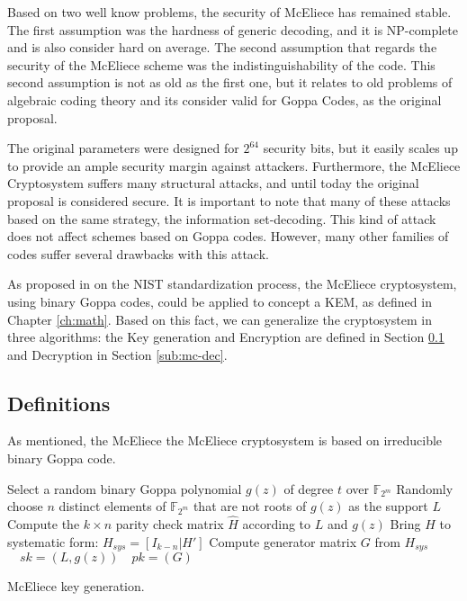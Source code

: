 Based on two well know problems, the security of McEliece has remained stable. The first assumption was the hardness of generic decoding, and it is NP-complete and is also consider hard on average. The second assumption that regards the security of the McEliece scheme was the indistinguishability of the code. This second assumption is not as old as the first one, but it relates to old problems of algebraic coding theory and its consider valid for Goppa Codes, as the original proposal. 

The original parameters were designed for $2^{64}$ security bits, but it easily scales up to provide an ample security margin against attackers. Furthermore, the McEliece Cryptosystem suffers many structural attacks, and until today the original proposal is considered secure. It is important to note that many of these attacks based on the same strategy, the information set-decoding. This kind of attack does not affect schemes based on Goppa codes. However, many other families of codes suffer several drawbacks with this attack. 


As proposed in \cite{bernstein2017classic, bardet2017big} on the NIST standardization process, the McEliece cryptosystem, using binary Goppa codes, could be applied to concept a KEM, as defined in Chapter \ref{ch:math}. Based on this fact, we can generalize the cryptosystem in three algorithms: the Key generation and Encryption are defined in Section \ref{sub:mc-def} and Decryption in Section \ref{sub:mc-dec}.

\subsection{Definitions}
\label{sub:mc-def}
As mentioned, the McEliece the McEliece cryptosystem is based on irreducible binary Goppa code. 

\begin{algorithm}[!ht]
 Select a random binary Goppa polynomial $g(z)$ of degree $t$ over $\mathbb{F}_{2^{m}}$\;
 Randomly choose $n$ distinct elements of $\mathbb{F}_{2^m}$ that are not roots of $g(z)$ as the support $L$\;
 Compute the $k \times n$ parity check matrix $\hat{H}$ according to $L$ and $g(z)$\;
 Bring $H$ to systematic form: $H_{sys} = [I_{k-n}|H']$\;
 Compute generator matrix $G$ from $H_{sys}$\;
 \Return $\quad sk = (L, g(z)) \quad pk = (G)$\;
 \caption{McEliece key generation.}
 \label{alg:1}
\end{algorithm}


